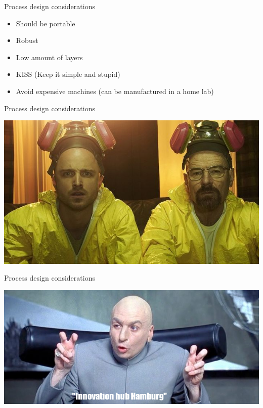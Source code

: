 \documentclass[9pt]{beamer}
\begin{document}
\begin{frame}{Process design considerations}
	\begin{itemize}
		\item Should be portable
		\item Robust
		\item Low amount of layers
		\item KISS (Keep it simple and stupid)
		\item Avoid expensive machines (can be manufactured in a home lab)
	\end{itemize}
\end{frame}

\begin{frame}{Process design considerations}
\begin{center}
\includegraphics[width=\textwidth]{images/breaking-bad.jpg}
\end{center}
\end{frame}

\begin{frame}{Process design considerations}
\begin{center}
\includegraphics[width=\textwidth]{images/deinnovation.png}
\end{center}
\end{frame}
\end{document}
